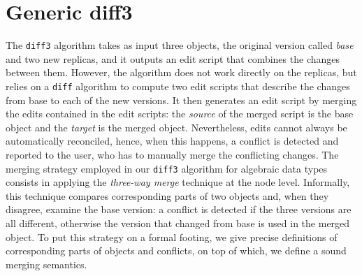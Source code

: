 \documentclass{sigplanconf}
\theoremstyle{plain}
\begin{document}
\section{Generic diff3}
\label{sec:generic-diff3}
The \texttt{diff3} algorithm takes as input three objects, the
original version called \emph{base} and two new replicas, and it
outputs an edit script that combines the changes between them.
%
However, the algorithm does not work directly on the replicas, but
relies on a \texttt{diff} algorithm to compute two edit scripts that
describe the changes from base to each of the new versions.
%
It then generates an edit script by merging the edits contained in the
edit scripts: the \emph{source} of the merged script is the base
object and the \emph{target} is the merged object.
%
Nevertheless, edits cannot always be automatically reconciled, hence,
when this happens, a conflict is detected and reported to the user,
who has to manually merge the conflicting changes.
%
%
The merging strategy employed in our \texttt{diff3} algorithm for
algebraic data types consists in applying the \emph{three-way merge}
technique at the node level.
%
Informally, this technique compares corresponding parts of two objects
and, when they disagree, examine the base version: a conflict is
detected if the three versions are all different, otherwise the version that
changed from base is used in the merged object.
%	
To put this strategy on a formal footing, we give precise definitions
of corresponding parts of objects and conflicts, on top of which, we
define a sound merging semantics.
\end{document}
